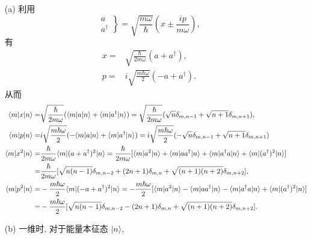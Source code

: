 \documentclass{assignment}
\begin{document}
\begin{sol}
    \begin{itemize}
        \item[(a)] 利用
        \[
            \left.\begin{array}{l}
                a\\
                a^{\dagger}
            \end{array}\right\}=\sqrt{\frac{m\omega}{\hbar}}\left(x\pm\frac{ip}{m\omega}\right),
        \]
        有
        \begin{align}
            x=&\sqrt{\frac{\hbar}{2m\omega}}(a+a^{\dagger}),\\
            p=&i\sqrt{\frac{m\hbar\omega}{2}}(-a+a^{\dagger}).
        \end{align}
        从而
        \begin{align}
            \langle m\rvert x\lvert n\rangle=&\sqrt{\frac{\hbar}{2m\omega}}(\langle m\rvert a\lvert n\rangle+\langle m\rvert a^{\dagger}\lvert n\rangle)=\sqrt{\frac{\hbar}{2m\omega}}(\sqrt{n}\delta_{m,n-1}+\sqrt{n+1}\delta_{m,n+1}),\\
            \langle m\rvert p\lvert n\rangle=&i\sqrt{\frac{m\hbar\omega}{2}}(-\langle m\rvert a\lvert n\rangle+\langle m\rvert a^{\dagger}\lvert n\rangle)=i\sqrt{\frac{m\hbar\omega}{2}}(-\sqrt{n}\delta_{m,n-1}+\sqrt{n+1}\delta_{m,n+1})\\
            \notag\langle m\rvert x^2\lvert n\rangle=&\frac{\hbar}{2m\omega}\langle m\rvert(a+a^{\dagger})^2\lvert n\rangle=\frac{\hbar}{2m\omega}[\langle m\rvert a^2\lvert n\rangle+\langle m\rvert aa^{\dagger}\lvert n\rangle+\langle m\rvert a^{\dagger}a\lvert n\rangle+\langle m\rvert(a^{\dagger})^2\lvert n\rangle]\\
            =&\frac{\hbar}{2m\omega}[\sqrt{n(n-1)}\delta_{m,n-2}+(2n+1)\delta_{m,n}+\sqrt{(n+1)(n+2)}\delta_{m,n+2}],\\
            \notag\langle m\rvert p^2\lvert n\rangle=&-\frac{m\hbar\omega}{2}\langle m\rvert(-a+a^{\dagger})^2\lvert n\rangle=-\frac{m\hbar\omega}{2}[\langle m\rvert a^2\lvert n\rangle-\langle m\rvert aa^{\dagger}\lvert n\rangle-\langle m\rvert a^{\dagger}a\lvert n\rangle+\langle m\rvert(a^{\dagger})^2\lvert n\rangle]\\
            =&-\frac{m\hbar\omega}{2}[\sqrt{n(n-1)}\delta_{m,n-2}-(2n+1)\delta_{m,n}+\sqrt{(n+1)(n+2)}\delta_{m,n+2}].
        \end{align}
        \item[(b)] 一维时, 对于能量本征态 $\lvert n\rangle$,
        \begin{align}

\end{align}
\end{itemize}
\end{sol}
\end{document}
